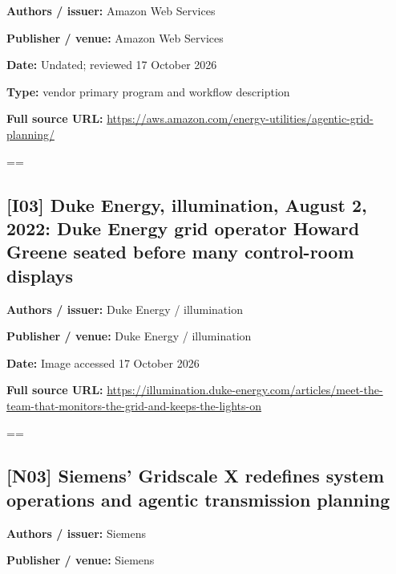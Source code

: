 \documentclass[10pt,letterpaper]{article}
\begin{document}
\textbf{Authors / issuer:} Amazon Web Services\par
\textbf{Publisher / venue:} Amazon Web Services\par
\textbf{Date:} Undated; reviewed 17 October 2026\par
\textbf{Type:} vendor primary program and workflow description\par
\textbf{Full source URL:} \href{https://aws.amazon.com/energy-utilities/agentic-grid-planning/}{\small\ttfamily https:/\allowbreak{}/\allowbreak{}aws.\allowbreak{}amazon.\allowbreak{}com/\allowbreak{}energy-\allowbreak{}utilities/\allowbreak{}agentic-\allowbreak{}grid-\allowbreak{}planning/\allowbreak{}}\par
\egroup\par\noindent\box\readingEntry\par\medskip
\setbox\readingEntry=\vbox\bgroup\hsize=\linewidth\subsection*{[I03] Duke Energy, illumination, August 2, 2022: Duke Energy grid operator Howard Greene seated before many control-room displays}
\textbf{Authors / issuer:} Duke Energy / illumination\par
\textbf{Publisher / venue:} Duke Energy / illumination\par
\textbf{Date:} Image accessed 17 October 2026\par
\textbf{Full source URL:} \href{https://illumination.duke-energy.com/articles/meet-the-team-that-monitors-the-grid-and-keeps-the-lights-on}{\small\ttfamily https:/\allowbreak{}/\allowbreak{}illumination.\allowbreak{}duke-\allowbreak{}energy.\allowbreak{}com/\allowbreak{}articles/\allowbreak{}meet-\allowbreak{}the-\allowbreak{}team-\allowbreak{}that-\allowbreak{}monitors-\allowbreak{}the-\allowbreak{}grid-\allowbreak{}and-\allowbreak{}keeps-\allowbreak{}the-\allowbreak{}lights-\allowbreak{}on}\par
\egroup\par\noindent\box\readingEntry\par\medskip
\setbox\readingEntry=\vbox\bgroup\hsize=\linewidth\subsection*{[N03] Siemens' Gridscale X redefines system operations and agentic transmission planning}
\textbf{Authors / issuer:} Siemens\par
\textbf{Publisher / venue:} Siemens\par
\end{document}
